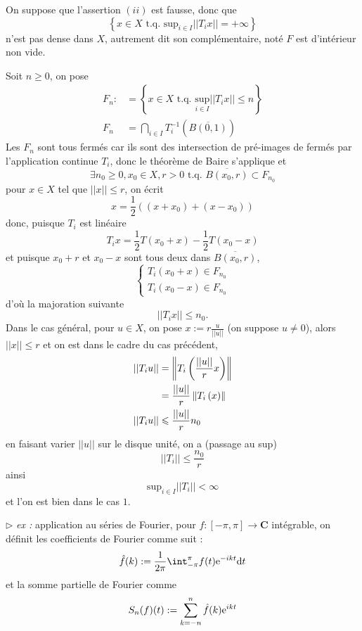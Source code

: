 \documentclass[a4paper,11pt, twoside]{article}
\begin{document}
\begin{Proof}
  On suppose que l'assertion $(ii)$ est fausse, donc que 
  $$\left\{x\in X\text{ t.q. } \mathrm{sup}_{i\in I}||T_ix||=+\infty\right\}$$ 
  n'est pas dense dans $X$, autrement dit son complémentaire, noté $F$ est d'intérieur non vide.

  Soit $n\geqslant 0$, on pose 
  \begin{align*}
    F_n:&=\left\{x\in X\text{ t.q. }\underset{i\in I}{\mathrm{sup}}||T_ix||\leqslant n\right\}\\
    F_n&=\bigcap_{i\in I}T_i^{-1}\left(\overline{B(0,1)}\right)
  \end{align*}
  Les $F_n$ sont tous fermés car ils sont des intersection de pré-images de fermés par l'application continue $T_i$, donc le théorème de Baire s'applique et 
  $$\exists n_0\geqslant 0, x_0\in X, r>0\text{ t.q. }\overline{B(x_0,r)}\subset F_{n_0}$$
  pour $x\in X$ tel que $||x||\leqslant r$, on écrit
  $$x=\frac12\left((x+x_0)+(x-x_0)\right)$$
  donc, puisque $T_i$ est linéaire
  $$T_ix=\frac12T(x_0+x)-\frac12T(x_0-x)$$
  et puisque $x_0+r$ et $x_0-x$ sont tous deux dans $\overline{B(x_0,r)}$, 
  $$\left\{\begin{array}{l}
    T_i(x_0+x)\in F_{n_0}\\
    T_i(x_0-x)\in F_{n_0}
  \end{array}\right.$$
  d'où la majoration suivante 
  $$||T_ix||\leqslant n_0.$$
  Dans le cas général, pour $u\in X$, on pose $x:=r\frac{u}{||u||}$ (on suppose $u\neq 0$), alors $||x||\leqslant r$ et on est dans le cadre du cas précédent, 
  \begin{align*}
    ||T_iu||&=\left\lVert T_i\left(\frac{||u||}{r}x\right)\right\rVert\\
    &=\frac{||u||}{r}\left\lVert T_i\left(x\right)\right\rVert\\
    ||T_iu||&\leqslant \frac{||u||}{r} n_0
  \end{align*}
  en faisant varier $||u||$ sur le disque unité, on a (passage au sup)
  $$||T_i||\leqslant \frac{n_0}{r}$$
  ainsi 
  $$\mathrm{sup}_{i\in I}||T_i||<\infty$$
  et l'on est bien dans le cas $\mathit 1$.
\end{Proof}

$\triangleright$\emph{ ex : }application au séries de Fourier, pour $f:[-\pi,\pi]\longrightarrow\mathbf C$ intégrable, on définit les coefficients de Fourier comme suit :
$$\hat f(k):=\frac{1}{2\pi}\int_{-\pi}^{\pi}f(t)\ex{-ikt}\mathrm dt$$
et la somme partielle de Fourier comme 
$$S_n(f)(t):=\sum_{k=-n}^n\hat f(k)\mathrm{e}^{ikt}$$
\end{document}
